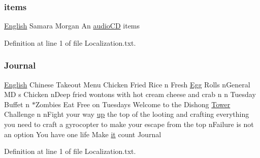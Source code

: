 \subsubsection{\texorpdfstring{items}{items}}
{\footnotesize\ttfamily \mbox{\hyperlink{_sphere_i_i_01_winter_01_project_2_config_2_localization_8txt_ad896b63205779b1b09e86d941ce13976}{English}} Samara Morgan An \mbox{\hyperlink{_sphere_i_i_01_music_01_boxes_2_config_2_localization_8txt_ae0a4281bb52a78c638f75d315de5da12}{audio\+CD}} items}



Definition at line 1 of file Localization.\+txt.

\mbox{\label{_dishong_01_tower_01_challenge_2_config_2_localization_8txt_a439eb818804ef3647145a6ddb30164e0}} 
\subsubsection{\texorpdfstring{Journal}{Journal}}
{\footnotesize\ttfamily \mbox{\hyperlink{_sphere_i_i_01_winter_01_project_2_config_2_localization_8txt_ad896b63205779b1b09e86d941ce13976}{English}} Chinese Takeout Menu Chicken Fried Rice n Fresh \mbox{\hyperlink{_sphere_i_i_01_winter_01_project_2_config_2_localization_8txt_a55334ab0b48a68a93004334728020f15}{Egg}} Rolls n\+General MD s Chicken n\+Deep fried wontons with hot cream cheese and crab n n Tuesday Buffet n $\ast$Zombies Eat Free on Tuesdays Welcome to the Dishong \mbox{\hyperlink{_dishong_01_tower_01_challenge_2_config_2_localization_8txt_ad03a7286db82f171f8e82a1eaf4e3eaf}{Tower}} Challenge n n\+Fight your way \mbox{\hyperlink{_the_01_restless_01_curse_2_config_2_localization_01-_01_quest_8txt_a2f8d5a9cc6c08e259de10d34d28f85c4}{up}} the top of the looting and crafting everything you need to craft a gyrocopter to make your escape from the top n\+Failure is not an option You have one life Make \mbox{\hyperlink{_the_01_restless_01_curse_2_config_2_localization_01-_01_quest_8txt_a741b285909bea4855b886664c2dcd50c}{it}} count Journal}



Definition at line 1 of file Localization.\+txt.

\mbox{\label{_dishong_01_tower_01_challenge_2_config_2_localization_8txt_ab3c7af4820830f9166ede9e5623c4e73}} 
